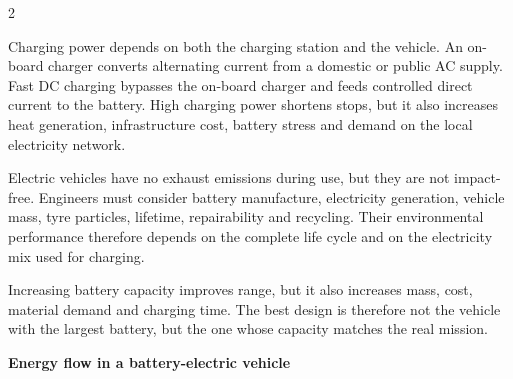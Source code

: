 \begin{multicols}{2}
\begin{ecarticle}
Charging power depends on both the charging station and the vehicle. An on-board charger converts alternating current from a domestic or public AC supply. Fast DC charging bypasses the on-board charger and feeds controlled direct current to the battery. High charging power shortens stops, but it also increases heat generation, infrastructure cost, battery stress and demand on the local electricity network.

Electric vehicles have no exhaust emissions during use, but they are not impact-free. Engineers must consider battery manufacture, electricity generation, vehicle mass, tyre particles, lifetime, repairability and recycling. Their environmental performance therefore depends on the complete life cycle and on the electricity mix used for charging.
\end{ecarticle}

\begin{tcolorbox}[title=\sffamily\bfseries Engineering Insight,colback=yellow!10,colframe=ECOrange]
Increasing battery capacity improves range, but it also increases mass, cost, material demand and charging time. The best design is therefore not the vehicle with the largest battery, but the one whose capacity matches the real mission.
\end{tcolorbox}

\columnbreak

\begin{engineeringfocus}
\textbf{Energy flow in a battery-electric vehicle}

\begin{center}
\end{center}


\end{engineeringfocus}
\end{multicols}
